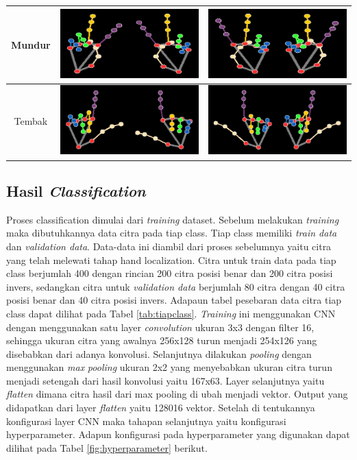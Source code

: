 \begin{table}[H]
\begin{tabular}{|c|c|c|}
  Mundur & \includegraphics[width=0.3\linewidth]{../Gambar/Mundur (1).png} & \includegraphics[width=0.3\linewidth]{../Gambar/MundurI (1).png} \\ \hline
  Tembak & \includegraphics[width=0.3\linewidth]{../Gambar/Tembak (1).png} & \includegraphics[width=0.3\linewidth]{../Gambar/TembakI (1).png} \\ \hline
  \end{tabular}
\end{table}




\subsection{Hasil \emph{Classification}}
Proses classification dimulai dari \emph{training} dataset. Sebelum melakukan \emph{training} maka dibutuhkannya data citra pada tiap class. Tiap class memiliki \emph{train data} dan \emph{validation data}. Data-data ini diambil dari proses sebelumnya yaitu citra yang telah melewati tahap hand localization. Citra untuk train data pada tiap class berjumlah 400 dengan rincian 200 citra posisi benar dan 200 citra posisi invers, sedangkan citra untuk \emph{validation data} berjumlah 80 citra dengan 40 citra posisi benar dan 40 citra posisi invers. Adapaun tabel pesebaran data citra tiap class dapat dilihat pada Tabel \ref{tab:tiapclass}. \emph{Training} ini menggunakan CNN dengan menggunakan satu layer \emph{convolution} ukuran 3x3 dengan filter 16, sehingga ukuran citra yang awalnya 256x128 turun menjadi 254x126 yang disebabkan dari adanya konvolusi. Selanjutnya dilakukan \emph{pooling} dengan menggunakan \emph{max} \emph{pooling} ukuran 2x2 yang menyebabkan ukuran citra turun menjadi setengah dari hasil konvolusi yaitu 167x63. Layer selanjutnya yaitu \emph{flatten} dimana citra hasil dari max pooling di ubah menjadi vektor. Output yang didapatkan dari layer \emph{flatten} yaitu 128016 vektor.  Setelah di tentukannya konfigurasi layer CNN maka tahapan selanjutnya yaitu konfigurasi hyperparameter. Adapun konfigurasi pada hyperparameter yang digunakan dapat dilihat pada Tabel \ref{fig:hyperparameter} berikut.

